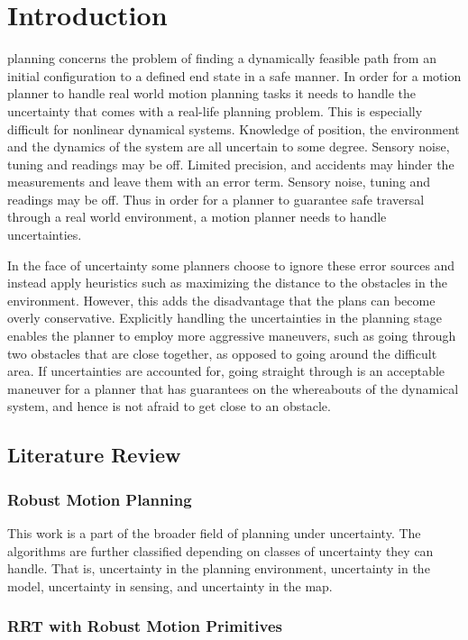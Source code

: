 
\section{Introduction}
 planning concerns the problem of finding a dynamically
feasible path from an initial configuration to a defined end state in a safe
manner. In order for a motion planner to handle real world motion planning tasks
it needs to handle the uncertainty that comes with a real-life planning problem.
This is especially difficult for nonlinear dynamical systems. Knowledge of
position, the environment and the dynamics of the system are all uncertain to
some degree. Sensory noise, tuning and readings may be off. Limited precision,
and accidents may hinder the measurements and leave them with an error term.
Sensory noise, tuning and readings may be off. Thus in order for a planner to
guarantee safe traversal through a real world environment, a motion planner
needs to handle uncertainties.

In the face of uncertainty some planners choose to ignore these error sources
and instead apply heuristics such as maximizing the distance to the obstacles in
the environment. However, this adds the disadvantage that the plans can become
overly conservative. Explicitly handling the uncertainties in the planning stage
enables the planner to employ more aggressive maneuvers, such as going through
two obstacles that are close together, as opposed to going around the difficult
area. If uncertainties are accounted for, going straight through is an
acceptable maneuver for a planner that has guarantees on the whereabouts of the
dynamical system, and hence is not afraid to get close to an obstacle.

\subsection{Literature Review}


\subsubsection{Robust Motion Planning}

This work is a part of the broader field of planning under uncertainty. The
algorithms are further classified depending on classes of uncertainty they can
handle. That is, uncertainty in the planning environment, uncertainty in the
model, uncertainty in sensing, and uncertainty in the map.

\subsubsection{RRT with Robust Motion Primitives}

